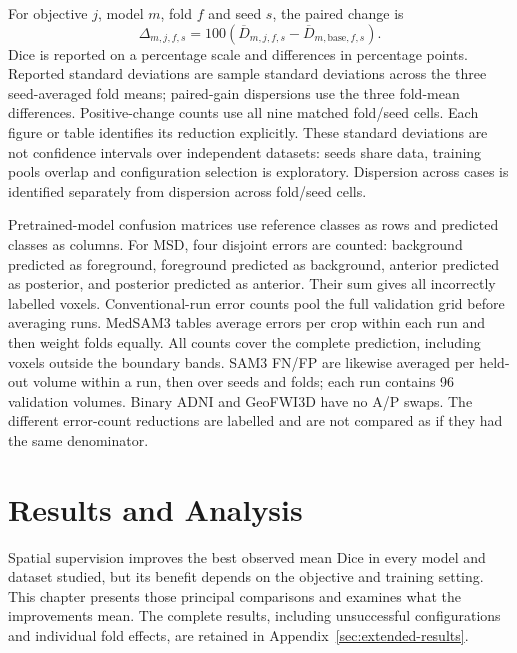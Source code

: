 \documentclass[12pt,a4paper]{article}
\begin{document}
For objective $j$, model $m$, fold $f$ and seed $s$, the paired change is
\begin{equation}
 \Delta_{m,j,f,s}=100\left(
 \overline D_{m,j,f,s}-\overline D_{m,\mathrm{base},f,s}\right).
\label{eq:paired-reported-gain}
\end{equation}
Dice is reported on a percentage scale and differences in percentage
points. Reported standard deviations are sample standard deviations across
the three seed-averaged fold means; paired-gain dispersions use the three
fold-mean differences. Positive-change counts use all nine matched
fold/seed cells. Each figure or table identifies its reduction explicitly.
These standard deviations are not confidence intervals over independent datasets: seeds share data,
training pools overlap and configuration selection is exploratory.
Dispersion across cases is identified separately from dispersion
across fold/seed cells.

Pretrained-model confusion matrices use reference classes as rows and
predicted classes as columns. For MSD, four disjoint errors are counted: background
predicted as foreground, foreground predicted as background, anterior
predicted as posterior, and posterior predicted as anterior. Their
sum gives all incorrectly labelled voxels. Conventional-run error counts pool the full validation grid before
averaging runs. MedSAM3 tables average errors per crop within each run
and then weight folds equally. All counts cover the complete prediction,
including voxels outside the boundary bands. SAM3 FN/FP are likewise
averaged per held-out volume within a run, then over seeds and folds;
each run contains 96 validation volumes. Binary ADNI and GeoFWI3D have
no A/P swaps. The different error-count reductions are labelled and are not compared
as if they had the same denominator.

\clearpage

\section{Results and Analysis}
\label{sec:results}

Spatial supervision improves the best observed mean Dice in every model
and dataset studied, but its benefit depends on the objective and training
setting. This chapter presents those principal comparisons and examines
what the improvements mean. The complete results, including unsuccessful
configurations and individual fold effects, are retained in
Appendix~\ref{sec:extended-results}.
\end{document}
